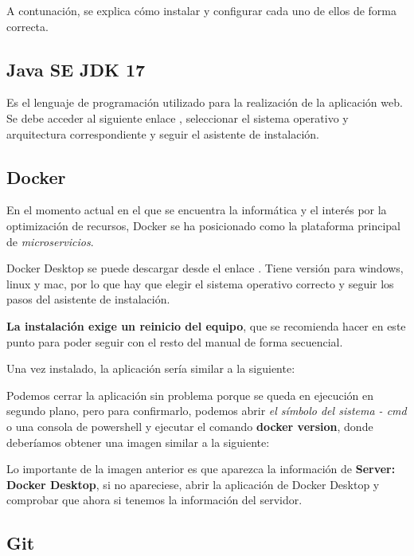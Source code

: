 A contunación, se explica cómo instalar y configurar cada uno de ellos de forma correcta.

\subsection{Java SE JDK 17}

Es el lenguaje de programación utilizado para la realización de la aplicación web.
Se debe acceder al siguiente enlace \cite{web:JavaJDK}, seleccionar el sistema operativo y arquitectura correspondiente y seguir el asistente de instalación.

\subsection{Docker}

En el momento actual en el que se encuentra la informática y el interés por la optimización de recursos, Docker se ha posicionado como la plataforma principal de \textit{microservicios}.

Docker Desktop se puede descargar desde el enlace \cite{web:dockerDesktop}. Tiene versión para windows, linux y mac, por lo que hay que elegir el sistema operativo correcto y seguir los pasos del asistente de instalación.

\textbf{La instalación exige un reinicio del equipo}, que se recomienda hacer en este punto para poder seguir con el resto del manual de forma secuencial.

Una vez instalado, la aplicación sería similar a la siguiente:

Podemos cerrar la aplicación sin problema porque se queda en ejecución en segundo plano, pero para confirmarlo, podemos abrir \textit{el símbolo del sistema - cmd} o una consola de powershell y ejecutar el comando \textbf{docker version}, donde deberíamos obtener una imagen similar a la siguiente:

Lo importante de la imagen anterior es que aparezca la información de \textbf{Server: Docker Desktop}, si no apareciese, abrir la aplicación de Docker Desktop y comprobar que ahora si tenemos la información del servidor.

\subsection{Git}

